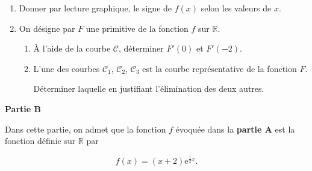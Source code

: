 \documentclass[10pt]{article}
\newcommand{\R}{\mathbb{R}}
\begin{document}

\begin{enumerate}
\item Donner par lecture graphique, le signe de $f(x)$ selon les valeurs de $x$. 
\item On désigne par $F$ une primitive de la fonction $f$ sur $\R$.
	\begin{enumerate}
		\item À l'aide de la courbe $\mathcal{C}$, déterminer $F'(0)$ et $F'(- 2)$. 
		\item L'une des courbes $\mathcal{C}_{1}$, $\mathcal{C}_{2}$, $\mathcal{C}_{3}$ est la courbe représentative de la fonction $F$. 

Déterminer laquelle en justifiant l'élimination des deux autres.
	\end{enumerate} 
\end{enumerate}

\bigskip

\textbf{Partie B}

\medskip

Dans cette partie, on admet que la fonction $f$ évoquée dans la \textbf{partie A} est la fonction définie sur $\R$ par 

\[f(x) = (x + 2) \text{e}^{\frac{1}{2}x}.\]
\end{document}
